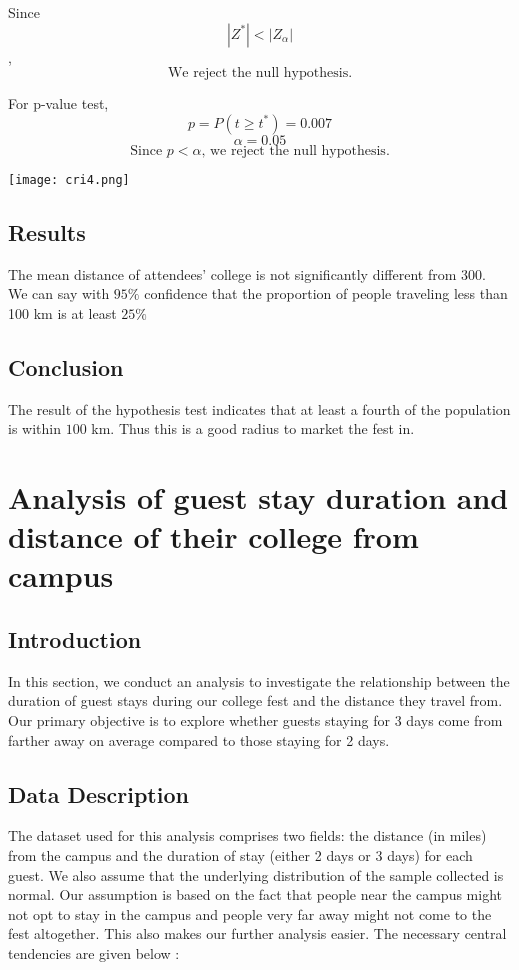 \documentclass[oneside]{book}
\begin{document}
Since 
\[ |Z^*| < |Z_{\alpha}|\],
\[\text{We reject the null hypothesis.}\]

For p-value test,
\[p = P(t \geq t^*) = 0.007\]
\[\alpha = 0.05\]
\[\text{Since $p < \alpha$, we reject the null hypothesis.}\]


\begin{minipage}{\textwidth}
    \centering
    \texttt{[image: cri4.png]}
    \label{fig:enter-label}
\end{minipage}



\section{Results}
The mean distance of attendees' college is not significantly different from 300.\\We can say with $95\%$ confidence that the proportion of people traveling less than 100 km is at least $25\%$

\section{Conclusion}
The result of the hypothesis test indicates that at least a fourth of the population is within $100$ km. Thus this is a good radius to market the fest in. 

\chapter{Analysis of guest stay duration and distance of their college from campus}

\section{Introduction}
In this section, we conduct an analysis to investigate the relationship between the duration of guest stays during our college fest and the distance they travel from. Our primary objective is to explore whether guests staying for 3 days come from farther away on average compared to those staying for 2 days.

\section{Data Description}
The dataset used for this analysis comprises two fields: the distance (in miles) from the campus and the duration of stay (either 2 days or 3 days) for each guest. We also assume that the underlying distribution of the sample collected is normal. Our assumption is based on the fact that people near the campus might not opt to stay in the campus and people very far away might not come to the fest altogether. This also makes our further analysis easier. The necessary central tendencies are given below :
\end{document}
